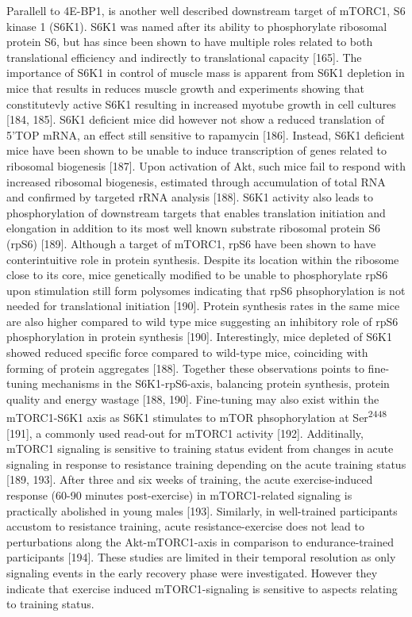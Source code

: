 \documentclass[twoside,10pt]{gihclass} %
\begin{document}
Parallell to 4E-BP1, is another well described downstream target of mTORC1, S6 kinase 1 (S6K1).
S6K1 was named after its ability to phosphorylate ribosomal protein S6, but has since been shown to have multiple roles related to both translational efficiency and indirectly to translational capacity
{[}165{]}.
The importance of S6K1 in control of muscle mass is apparent from S6K1 depletion in mice that results in reduces muscle growth and experiments showing that constitutevly active S6K1 resulting in increased myotube growth in cell cultures
{[}184, 185{]}.
S6K1 deficient mice did however not show a reduced translation of 5'TOP mRNA, an effect still sensitive to rapamycin
{[}186{]}.
Instead, S6K1 deficient mice have been shown to be unable to induce transcription of genes related to ribosomal biogenesis
{[}187{]}.
Upon activation of Akt, such mice fail to respond with increased ribosomal biogenesis, estimated through accumulation of total RNA and confirmed by targeted rRNA analysis
{[}188{]}.
S6K1 activity also leads to phosphorylation of downstream targets that enables translation initiation and elongation in addition to its most well known substrate ribosomal protein S6 (rpS6)
{[}189{]}.
Although a target of mTORC1, rpS6 have been shown to have conterintuitive role in protein synthesis.
Despite its location within the ribosome close to its core, mice genetically modified to be unable to phosphorylate rpS6 upon stimulation still form polysomes indicating that rpS6 phsophorylation is not needed for translational initiation
{[}190{]}.
Protein synthesis rates in the same mice are also higher compared to wild type mice suggesting an inhibitory role of rpS6 phosphorylation in protein synthesis
{[}190{]}.
Interestingly, mice depleted of S6K1 showed reduced specific force compared to wild-type mice, coinciding with forming of protein aggregates
{[}188{]}.
Together these observations points to fine-tuning mechanisms in the S6K1-rpS6-axis, balancing protein synthesis, protein quality and energy wastage
{[}188, 190{]}.
Fine-tuning may also exist within the mTORC1-S6K1 axis as S6K1 stimulates to mTOR phsophorylation at Ser\textsuperscript{2448}
{[}191{]},
a commonly used read-out for mTORC1 activity
{[}192{]}.
Additinally, mTORC1 signaling is sensitive to training status evident from changes in acute signaling in response to resistance training depending on the acute training status
{[}189, 193{]}.
After three and six weeks of training, the acute exercise-induced response (60-90 minutes post-exercise) in mTORC1-related signaling is practically abolished in young males
{[}193{]}.
Similarly, in well-trained participants accustom to resistance training, acute resistance-exercise does not lead to perturbations along the Akt-mTORC1-axis in comparison to endurance-trained participants
{[}194{]}.
These studies are limited in their temporal resolution as only signaling events in the early recovery phase were investigated.
However they indicate that exercise induced mTORC1-signaling is sensitive to aspects relating to training status.
\end{document}
